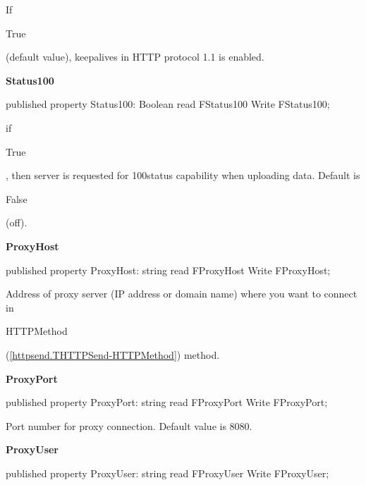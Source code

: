 \documentclass{report}
\newif\ifpdf
\begin{document}
\begin{list}{}
\begin{flushleft}
\ifpdf
\end{flushleft}
\fi


\par If \begin{ttfamily}True\end{ttfamily} (default value), keepalives in HTTP protocol 1.1 is enabled.\label{httpsend.THTTPSend-Status100}
\item[\textbf{Status100}\hfill]
\ifpdf
\begin{flushleft}
\fi
\begin{ttfamily}
published property Status100: Boolean read FStatus100 Write FStatus100;\end{ttfamily}

\ifpdf
\end{flushleft}
\fi


\par if \begin{ttfamily}True\end{ttfamily}, then server is requested for 100status capability when uploading data. Default is \begin{ttfamily}False\end{ttfamily} (off).\label{httpsend.THTTPSend-ProxyHost}
\item[\textbf{ProxyHost}\hfill]
\ifpdf
\begin{flushleft}
\fi
\begin{ttfamily}
published property ProxyHost: string read FProxyHost Write FProxyHost;\end{ttfamily}

\ifpdf
\end{flushleft}
\fi


\par Address of proxy server (IP address or domain name) where you want to connect in \begin{ttfamily}HTTPMethod\end{ttfamily}(\ref{httpsend.THTTPSend-HTTPMethod}) method.\label{httpsend.THTTPSend-ProxyPort}
\item[\textbf{ProxyPort}\hfill]
\ifpdf
\begin{flushleft}
\fi
\begin{ttfamily}
published property ProxyPort: string read FProxyPort Write FProxyPort;\end{ttfamily}

\ifpdf
\end{flushleft}
\fi


\par Port number for proxy connection. Default value is 8080.\label{httpsend.THTTPSend-ProxyUser}
\item[\textbf{ProxyUser}\hfill]
\ifpdf
\begin{flushleft}
\fi
\begin{ttfamily}
published property ProxyUser: string read FProxyUser Write FProxyUser;\end{ttfamily}


\end{flushleft}
\end{list}
\end{document}
